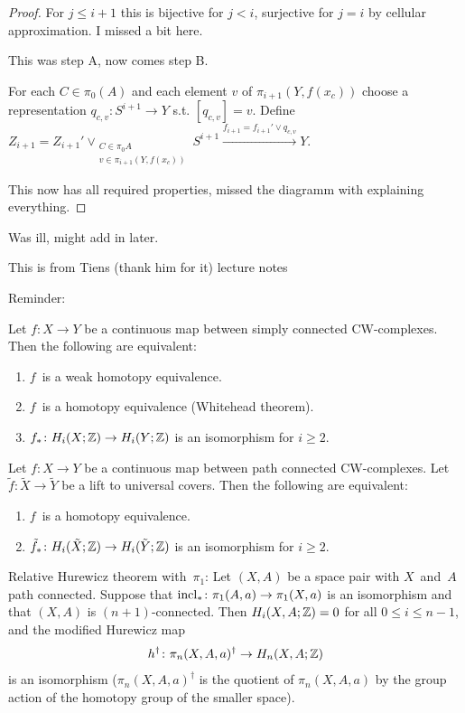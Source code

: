 \documentclass[language=english]{TemplateLecture}
\begin{document}
\begin{proof}
    For \(j \leq i+1\) this is bijective for \(j <i\), surjective for \(j = i\) by cellular approximation. I missed a bit here.

    This was step A, now comes step B.

    For each \(C \in \pi_0(A)\) and each element \(v\) of \(\pi_{i+1}(Y, f(x_c))\) choose a representation \(q_{c,v}\colon S^{i+1} \to Y\) s.t. \([q_{c,v}] = v\). Define \(Z_{i+1} = Z_{i+1}'\vee_{\substack{C\in \pi_0 A\\ v \in \pi_{i+1}(Y,f(x_c))}} S^{i+1} \xrightarrow{f_{i+1} = f_{i+1}' \vee q_{c,v}} Y\).

    This now has all required properties, missed the diagramm with explaining everything.
\end{proof}


Was ill, might add in later.

This is from Tiens (thank him for it) lecture notes

\iffalse
Reminder:

Let \(f \colon X \to Y\) be a continuous map between simply connected CW-complexes.
Then the following are equivalent:
\begin{enumerate}
    \item \(f\)~is a weak homotopy equivalence.
    \item \(f\)~is a homotopy equivalence (Whitehead theorem).
    \item \(f_* \colon H_i(X; \mathbb{Z}) \to H_i(Y; \mathbb{Z})\) is an isomorphism for \(i \ge 2\).
\end{enumerate}

Let \(f \colon X \to Y\) be a continuous map between path connected CW-complexes.
Let \(\tilde{f} \colon \tilde{X} \to \tilde{Y}\) be a lift to universal covers.
Then the following are equivalent:
\begin{enumerate}
    \item \(f\)~is a homotopy equivalence.
    \item \(\tilde{f}_* \colon H_i(\tilde{X}; \mathbb{Z}) \to H_i(\tilde{Y}; \mathbb{Z})\) is an isomorphism for \(i \ge 2\).
\end{enumerate}

Relative Hurewicz theorem with~\(\pi_1\): Let \((X,A)\) be a space pair with \(X\)~and~\(A\) path connected.
Suppose that \(\operatorname{incl}_* \colon \pi_1(A,a) \to \pi_1(X,a)\) is an isomorphism and that \((X,A)\) is \((n+1)\)-connected.
Then \(H_i(X,A; \mathbb{Z}) = 0\) for all \(0 \le i \le n-1\), and the modified Hurewicz map
\begin{equation*}
    h^{\dag} \colon \pi_n(X,A,a)^{\dag} \to H_n(X,A; \mathbb{Z})
\end{equation*}
is an isomorphism (\(\pi_n(X,A,a)^{\dag}\) is the quotient of \(\pi_n(X,A,a)\) by the group action of the homotopy group of the smaller space).
\end{document}
